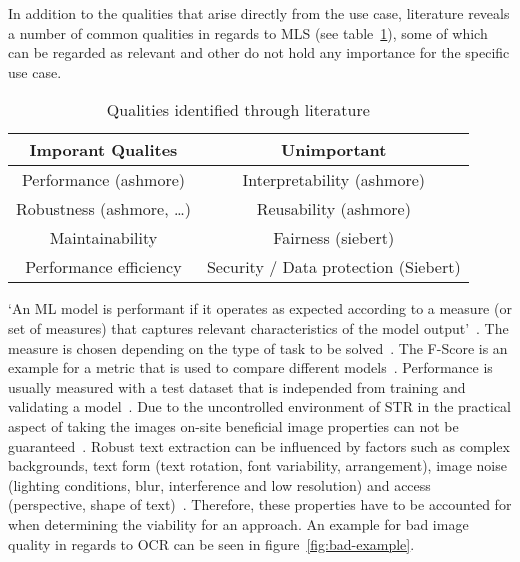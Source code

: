 In addition to the qualities that arise directly from the use case, literature reveals a number of
common qualities in regards to \ac{MLS} (see table~\ref{tb:literatureQualities}), some of which
can be regarded as relevant and other do not hold any importance for the specific use case.
\begin{table}[h]\label{tb:literatureQualities}
    \centering
    \begin{tabular}{c c}
        Imporant Qualites & Unimportant \\
        \hline
        Performance (ashmore)& Interpretability (ashmore) \\
        Robustness (ashmore, \ldots) & Reusability (ashmore) \\
        Maintainability & Fairness (siebert) \\
        Performance efficiency & Security / Data protection (Siebert)\\
    \end{tabular}
    \caption{Qualities identified through literature}
\end{table}
`An ML model is performant if it operates as expected according to a measure (or set of measures)
that captures relevant characteristics of the model output'~\citep{ashmore_assuring_2021}.
The measure is chosen depending on the type of task to be solved~\citep{siebert_construction_2021}.
The F-Score is an example for a metric that is used to compare different
models~\cite{chen_text_2021, long_scene_2021}.
Performance is usually measured with a test dataset that is independed from training and validating
a model~\cite{goodfellow_deep_2016}.
Due to the uncontrolled environment of \ac{STR} in the practical aspect of taking the images on-site
beneficial image properties can not be guaranteed~\citep{chen_text_2021}.
Robust text extraction can be influenced by factors such as complex backgrounds, text form
(text rotation, font variability, arrangement), image noise (lighting conditions, blur,
interference and low resolution) and access (perspective, shape of
text)~\citep{oyedotun_deep_2015,ghosh_visual_2017,chen_text_2021}.
Therefore, these properties have to be accounted for when determining the viability for an approach.
An example for bad image quality in regards to \ac{OCR} can be seen in figure~\ref{fig:bad-example}.


